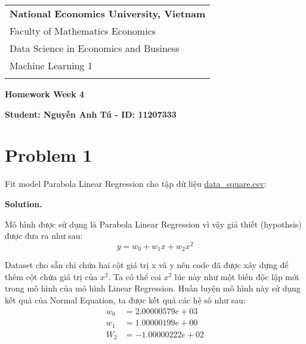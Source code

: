 \documentclass[a4paper, 12pt]{article}  %
\begin{document}
\thispagestyle{empty} %

\begin{tabular}{p{12.5cm}} %
{\large \bf National Economics University, Vietnam} \\
Faculty of Mathematics Economics \\ Data Science in Economics and Business  \\ Machine Learning 1\\
\hline %
\\
\end{tabular} %

\vspace*{0.3cm} %

\begin{center} %
	{\Large \bf Homework Week 4} %
	\vspace{2mm}
	
	{\bf Student: Nguyễn Anh Tú - ID: 11207333} %
\end{center}  

\section{Problem 1}

Fit model Parabola Linear Regression cho tập dữ liệu \href{https://github.com/nttuan8/DL_Tutorial/blob/master/L1/data_square.csv}{data\_square.csv}:

\textbf{Solution.} 

Mô hình được sử dụng là Parabola Linear Regression vì vậy giả thiết (hypothsis) được đưa ra như sau:
\[y = w_0 + w_1 x + w_2 x^2\]

Dataset cho sẵn chỉ chứa hai cột giá trị x và y nên code đã được xây dựng để thêm cột chứa giá trị của $x^2$. Ta có thể coi $x^2$ lúc này như một biến độc lập mới trong mô hình của mô hình Linear Regression. Huấn luyện mô hình này sử dụng kết quả của Normal Equation, ta được kết quả các hệ số như sau:
\begin{align*}
    w_0 &= 2.00000579e+03 \\
    w_1 &= 1.00000199e+00 \\
    W_2 &= -1.00000222e+02
\end{align*}
\end{document}
